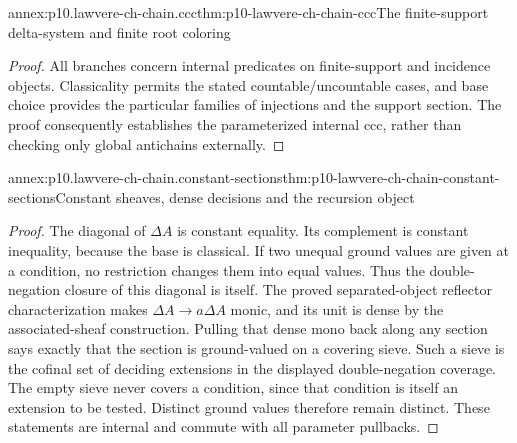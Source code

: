 \begin{annexitem}{annex:p10.lawvere-ch-chain.ccc}{thm:p10-lawvere-ch-chain-ccc}{The finite-support delta-system and finite root coloring}
\begin{proof}
All branches concern internal predicates on finite-support and incidence
objects. Classicality permits the stated countable/uncountable cases,
and base choice provides the particular families of injections and the
support section. The proof consequently establishes the parameterized
internal ccc, rather than checking only global antichains externally.
\end{proof}
\end{annexitem}

\begin{annexitem}{annex:p10.lawvere-ch-chain.constant-sections}{thm:p10-lawvere-ch-chain-constant-sections}{Constant sheaves, dense decisions and the recursion object}
\begin{proof}
The diagonal of \(\Delta A\) is constant equality. Its complement is
constant inequality, because the base is classical. If two unequal ground
values are given at a condition, no restriction changes them into equal
values. Thus the double-negation closure of this diagonal is itself.
The proved separated-object reflector characterization makes
\(\Delta A\to a\Delta A\) monic, and its unit is dense by the
associated-sheaf construction. Pulling that dense mono back along any
section says exactly that the section is ground-valued on a covering
sieve. Such a sieve is the cofinal set of deciding extensions in the
displayed double-negation coverage. The empty sieve never covers a
condition, since that condition is itself an extension to be tested.
Distinct ground values therefore remain distinct. These statements are
internal and commute with all parameter pullbacks.


\end{proof}
\end{annexitem}
